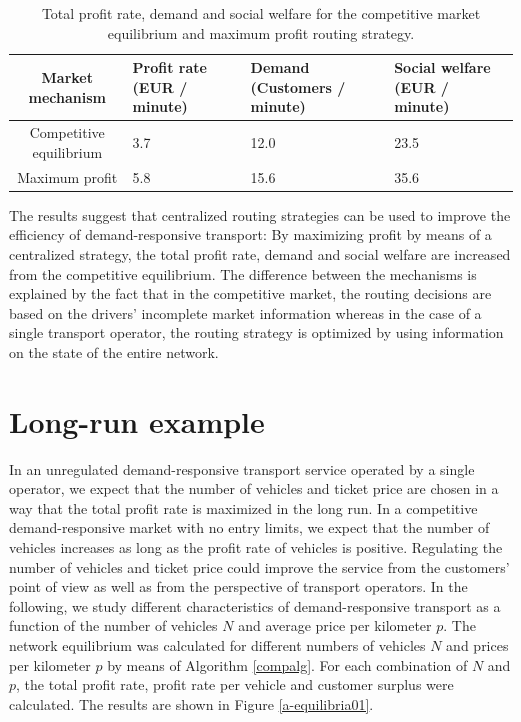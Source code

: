 \documentclass[dissertation,draft*]{aaltoseries}
\begin{document}
\begin{table}[ht]
\begin{center}
{\footnotesize
\begin{tabular}{|c|p{2.4cm}p{2.4cm}p{2.4cm}|}
\hline
Market mechanism & Profit rate (EUR / minute) & Demand (Customers / minute) & Social welfare (EUR / minute)\\
\hline
Competitive equilibrium & 3.7 & 12.0 & 23.5 \\
Maximum profit & 5.8 & 15.6 & 35.6 \\
\hline 
\end{tabular}
\caption{Total profit rate, demand and social welfare for the competitive market equilibrium and maximum profit routing strategy.}
\label{verkkovertailu}
}
\end{center}
\end{table}

The results suggest that centralized routing strategies can be used to improve the efficiency of demand-responsive transport:
By maximizing profit by means of a centralized strategy, the total profit rate, demand and social welfare are increased from
the competitive equilibrium. The difference between the mechanisms is explained by the fact that in the competitive market, 
the routing decisions are based on the drivers' incomplete market information whereas in the case of a single transport operator,
the routing strategy is optimized by using information on the state of the entire network.



\section{Long-run example}
\label{longrun}
In an unregulated demand-responsive transport service operated by a single operator, 
we expect that the number of vehicles and ticket price are chosen in a way that
the total profit rate is maximized in the long run.
In a competitive demand-responsive market with no entry limits, 
we expect that the number of vehicles increases as long as the profit
rate of vehicles is positive. 
Regulating the number of vehicles and ticket price could improve the service
from the customers' point of view as well as from the perspective of transport operators.
In the following, we study different characteristics of demand-responsive transport
as a function of the number of vehicles $N$ and average price per kilometer $p$.
The network equilibrium was calculated for different numbers
of vehicles $N$ and prices per kilometer $p$ by means of Algorithm \ref{compalg}.
For each combination of $N$ and $p$, the total profit rate, profit 
rate per vehicle and customer surplus were calculated. The results are shown in Figure \ref{a-equilibria01}.
\end{document}
